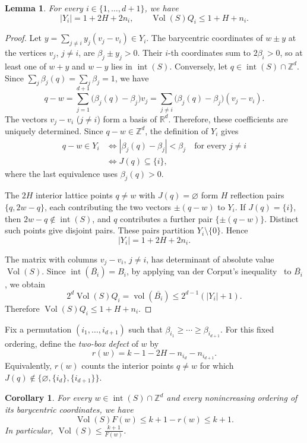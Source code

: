 \documentclass[reqno, 11pt]{article}
\numberwithin{equation}{section}
\newtheorem{lemma}[lemma]{Lemma}
\newtheorem{corollary}[corollary]{Corollary}
\theoremstyle{definition}
\begin{document}
\begin{lemma}\label{geo:lem:box}
For every $i\in\{1,\ldots,d+1\}$, we have
\[
 |Y_i|=1+2H+2n_i,\qquad \operatorname{Vol}(S)Q_i\le1+H+n_i.
\]
\end{lemma}
\begin{proof}
Let $y=\sum_{j\ne i}y_j(v_j-v_i)\in Y_i$.
The barycentric coordinates of $w\pm y$ at the vertices $v_j$,
$j\ne i$, are $\beta_j\pm y_j>0$.
Their $i$-th coordinates sum to $2\beta_i>0$, so at least one of
$w+y$ and $w-y$ lies in $\operatorname{int}(S)$.
Conversely, let $q\in\operatorname{int}(S)\cap\mathbb{Z}^d$.
Since $\sum_j\beta_j(q)=\sum_j\beta_j=1$, we have
\[
q-w
=\sum_{j=1}^{d+1}\bigl(\beta_j(q)-\beta_j\bigr)v_j
=\sum_{j\ne i}\bigl(\beta_j(q)-\beta_j\bigr)(v_j-v_i).
\]
The vectors $v_j-v_i$ ($j\ne i$) form a basis of $\mathbb{R}^d$. Therefore, these coefficients are uniquely determined.
Since $q-w\in\mathbb{Z}^d$, the definition of $Y_i$ gives
\[
\begin{aligned}
q-w\in Y_i
&\iff |\beta_j(q)-\beta_j|<\beta_j
      \quad\text{for every }j\ne i\\
&\iff J(q)\subseteq\{i\},
\end{aligned}
\]
where the last equivalence uses $\beta_j(q)>0$.

The $2H$ interior lattice points $q\ne w$ with
$J(q)=\varnothing$ form $H$ reflection pairs $\{q,2w-q\}$,
each contributing the two vectors $\pm(q-w)$ to $Y_i$.
If $J(q)=\{i\}$, then $2w-q\notin\operatorname{int}(S)$,
and $q$ contributes a further pair $\{\pm(q-w)\}$.
Distinct such points give disjoint pairs.
These pairs partition $Y_i\setminus\{0\}$. Hence
\[
|Y_i|=1+2H+2n_i.
\]

The matrix with columns $v_j-v_i$, $j\ne i$, has determinant
of absolute value $\operatorname{Vol}(S)$.
Since $\operatorname{int}(\overline{B_i})=B_i$, by applying van der Corput's inequality~\cite[(1)]{A18} to $\overline{B_i}$, we obtain
\[
2^d\operatorname{Vol}(S)Q_i
=\operatorname{vol}(\overline{B_i})
\le 2^{d-1}(|Y_i|+1).
\]
Therefore $\operatorname{Vol}(S)Q_i\le 1+H+n_i$.
\end{proof}


Fix a permutation $(i_1,\ldots,i_{d+1})$ such that
$\beta_{i_1}\ge\cdots\ge\beta_{i_{d+1}}$. 
For this fixed ordering, define the
\emph{two-box defect} of $w$ by
\[
r(w)=k-1-2H-n_{i_d}-n_{i_{d+1}}.
\]
Equivalently, $r(w)$ counts the interior points
$q\ne w$ for which $J(q)\notin
\{\varnothing,\{i_d\},\{i_{d+1}\}\}$.


\begin{corollary}\label{cor-bound-F(q)}
For every $w\in\operatorname{int}(S)\cap\mathbb Z^d$ and every
nonincreasing ordering of its barycentric coordinates, we have
\begin{equation}\label{geo:eq:two}
 \operatorname{Vol}(S)F(w)\le k+1-r(w)\le k+1.
\end{equation}
In particular, $\operatorname{Vol}(S)\le\frac{k+1}{F(w)}$.
\end{corollary}
\end{document}
